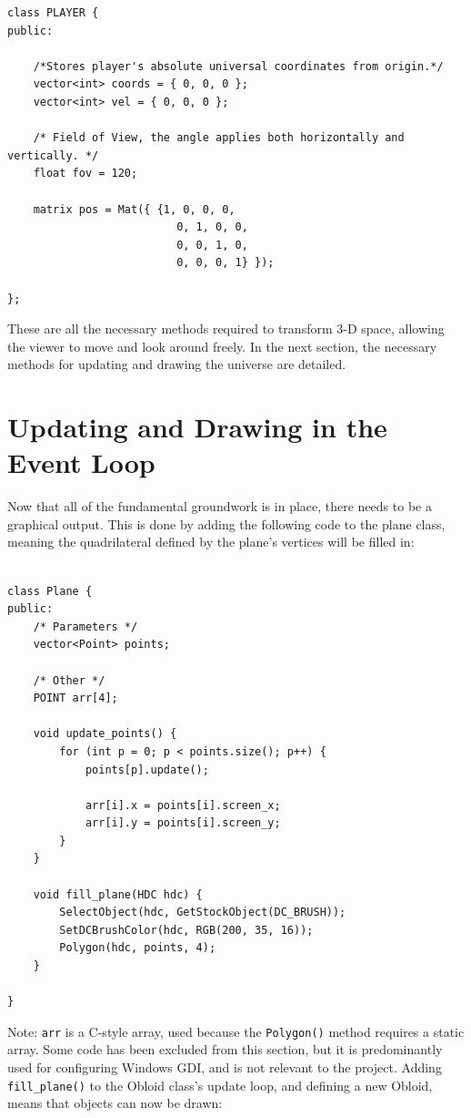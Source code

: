 \documentclass{article}
\begin{document}
\begin{lstlisting}
class PLAYER {
public:

	/*Stores player's absolute universal coordinates from origin.*/
	vector<int> coords = { 0, 0, 0 };
	vector<int> vel = { 0, 0, 0 };

	/* Field of View, the angle applies both horizontally and vertically. */
	float fov = 120;	
	
	matrix pos = Mat({ {1, 0, 0, 0,
						  0, 1, 0, 0,
						  0, 0, 1, 0,
						  0, 0, 0, 1} });

};
\end{lstlisting}

These are all the necessary methods required to transform 3-D space, allowing the viewer to move and look around freely. In the next section, the necessary methods for updating and drawing the universe are detailed.
\newpage

\section{Updating and Drawing in the Event Loop}

Now that all of the fundamental groundwork is in place, there needs to be a graphical output. This is done by adding the following code to the plane class, meaning the quadrilateral defined by the plane's vertices will be filled in:

\begin{lstlisting}

class Plane {
public:
	/* Parameters */
	vector<Point> points;
	
	/* Other */
	POINT arr[4];
	
	void update_points() {
		for (int p = 0; p < points.size(); p++) {
			points[p].update();
			
			arr[i].x = points[i].screen_x;
			arr[i].y = points[i].screen_y;
		}
	}
	
	void fill_plane(HDC hdc) {	
		SelectObject(hdc, GetStockObject(DC_BRUSH));
		SetDCBrushColor(hdc, RGB(200, 35, 16));
		Polygon(hdc, points, 4);
	}
	
}
\end{lstlisting}

Note: \verb|arr| is a C-style array, used because the \verb|Polygon()| method requires a static array. Some code has been excluded from this section, but it is predominantly used for configuring Windows GDI, and is not relevant to the project.
\newpage
Adding \verb|fill_plane()| to the Obloid class's update loop, and defining a new Obloid, means that objects can now be drawn:
\end{document}
